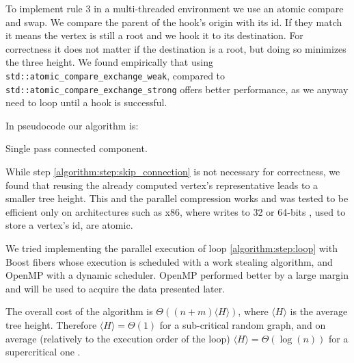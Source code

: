 To implement rule $3$ in a multi-threaded environment we use an atomic compare and swap.
We compare the parent of the hook's origin with its id. If they match it means the vertex is still
a root and we hook it to its destination. For correctness it does not matter if the destination is
a root, but doing so minimizes the three height.
We found empirically that using \verb|std::atomic_compare_exchange_weak|,
compared to \verb|std::atomic_compare_exchange_strong| offers better performance, as we anyway need
to loop until a hook is successful.

In pseudocode our algorithm is:

\begin{algorithm}[H]
    \caption{Single pass connected component.}
    \label{algorithm:cc2}
\end{algorithm}

While step \ref{algorithm:step:skip_connection} is not necessary for correctness, we found that
reusing the already computed vertex's representative leads to a smaller tree height. This and the
parallel compression works and was tested to
be efficient only on architectures such as x86, where writes to 32 or 64-bits , used to store a
vertex's id, are atomic.

We tried implementing the parallel execution of loop \ref{algorithm:step:loop} with  Boost fibers
\cite{Boost}
whose execution is scheduled with a work stealing algorithm, and OpenMP with a dynamic scheduler.
OpenMP performed better by a large margin and will be used to  acquire the data presented later.

The overall cost of the algorithm is $\Theta((n + m)\langle H \rangle)$, where $\langle H \rangle$
is
the average tree height. Therefore $\langle H \rangle = \Theta(1)$ for a sub-critical random graph,
and on average (relatively to the execution order of the loop) $\langle H \rangle = \Theta(\log(n))$
for a supercritical one \cite{RandomGraph}.

